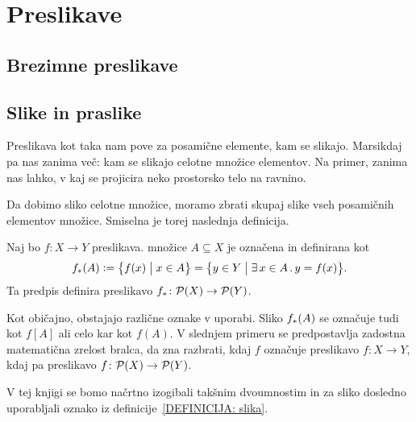 \chapter{Preslikave}

	
	
	\section{Brezimne preslikave}\label{RAZDELEK: Brezimne preslikave}
	
		
	
	
	\section{Slike in praslike}
	
		Preslikava kot taka nam pove za posamične elemente, kam se slikajo. Marsikdaj pa nas zanima več: kam se slikajo celotne množice elementov. Na primer, zanima nas lahko, v kaj se projicira neko prostorsko telo na ravnino.
		
		
		Da dobimo sliko celotne množice, moramo zbrati skupaj slike vseh posamičnih elementov množice. Smiselna je torej naslednja definicija.
		
		\begin{definicija}\label{DEFINICIJA: slika}
			Naj bo $f\colon X \to Y$ preslikava.  množice $A \subseteq X$ je označena in definirana kot
			\[\img{f}{A} \dfeq \set[1]{f(x)}{x \in A} = \set[1]{y \in Y}{\xsome{x}[A]{y = f(x)}}.\]
			Ta predpis definira preslikavo $\img{f}\colon \pst(X) \to \pst(Y)$.
		\end{definicija}
		
		\begin{opomba}
			Kot običajno, obstajajo različne oznake v uporabi. Sliko $\img{f}{A}$ se označuje tudi kot $f[A]$ ali celo kar kot $f(A)$. V slednjem primeru se predpostavlja zadostna matematična zrelost bralca, da zna razbrati, kdaj $f$ označuje preslikavo $f\colon X \to Y$, kdaj pa preslikavo $f\colon \mathcal{P}(X) \to \mathcal{P}(Y)$.
			
			V tej knjigi se bomo načrtno izogibali takšnim dvoumnostim in za sliko dosledno uporabljali oznako iz definicije~\ref{DEFINICIJA: slika}.
		\end{opomba}
		
